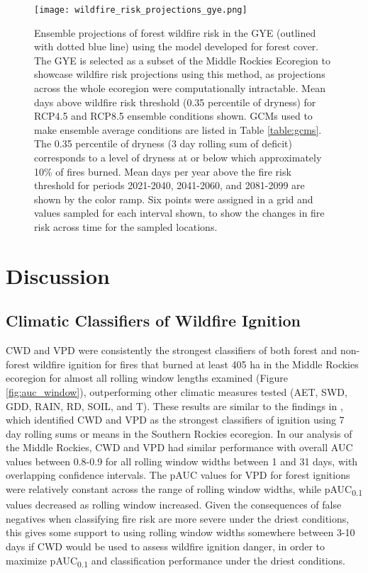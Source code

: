 \documentclass[11p]{article}
\newcommand{\pauc}[1]{pAUC\textsubscript{#1}}
\begin{document}
\begin{figure}[htbp]
  \centering
  \texttt{[image: wildfire\_risk\_projections\_gye.png]}
  \caption{Ensemble projections of forest wildfire risk in the GYE (outlined with dotted blue line) using the model developed for forest cover. The GYE is selected as a subset of the Middle Rockies Ecoregion to showcase wildfire risk projections using this method, as projections across the whole ecoregion were computationally intractable. Mean days above wildfire risk threshold (0.35 percentile of dryness) for RCP4.5 and RCP8.5 ensemble conditions shown. GCMs used to make ensemble average conditions are listed in Table \ref{table:gcms}. The 0.35 percentile of dryness (3 day rolling sum of deficit) corresponds to a level of dryness at or below which approximately 10\% of fires burned. Mean days per year above the fire risk threshold for periods 2021-2040, 2041-2060, and 2081-2099 are shown by the color ramp. Six points were assigned in a grid and values sampled for each interval shown, to show the changes in fire risk across time for the sampled locations.}
  \label{fig:projected-risk}
\end{figure}


\section{Discussion}

\subsection{Climatic Classifiers of Wildfire Ignition}
CWD and VPD were consistently the strongest classifiers of both forest and non-forest wildfire ignition for fires that burned at least 405 ha in the Middle Rockies ecoregion for almost all rolling window lengths examined (Figure \ref{fig:auc_window}), outperforming other climatic measures tested (AET, SWD, GDD, RAIN, RD, SOIL, and T). These results are similar to the findings in , which identified CWD and VPD as the strongest classifiers of ignition using 7 day rolling sums or means in the Southern Rockies ecoregion. In our analysis of the Middle Rockies, CWD and VPD had similar performance with overall AUC values between 0.8-0.9 for all rolling window widths between 1 and 31 days, with overlapping confidence intervals. The pAUC values for VPD for forest ignitions were relatively constant across the range of rolling window widths, while \pauc{0.1} values decreased as rolling window increased. Given the consequences of false negatives when classifying fire risk are more severe under the driest conditions, this gives some support to using rolling window widths somewhere between 3-10 days if CWD would be used to assess wildfire ignition danger, in order to maximize \pauc{0.1} and classification performance under the driest conditions.
\end{document}
